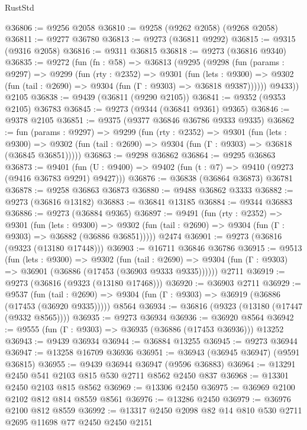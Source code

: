 \begin{lexlean}{RustStd}
\begin{coremodule}
{\begin{coremodule}
{{{{{{{{{{{{{{{{{{{{{{{{{{{{{{{{{{{{{{{{{{{{{{{{{{{{{{{@36806 := @9256 @2058
@36810 := @9258 (@9262 @2058) (@9268 @2058)
@36811 := @9277 @36780
@36813 := @9273 (@36811 @9292)
@36815 := @9315 (@9316 @2058)
@36816 := @9311 @36815
@36818 := @9273 (@36816 @9340)
@36835 := @9272
    (fun (fn : @58) =>
    @36813
      (@9295
        (@9298
          (fun (params : @9297) =>
          @9299
            (fun (rty : @2352) =>
            @9301
              (fun (lets : @9300) =>
              @9302 (fun (tail : @2690) => @9304 (fun (Γ : @9303) => @36818 @9387))))))
        @9433))
    @2105
@36838 := @9439 (@36811 (@9290 @2105))
@36841 := @9352 (@9353 @2105) @36783
@36845 := @9273 (@9344 (@36841 @9361) @9365)
@36846 := @9378 @2105
@36851 := @9375 (@9377 @36846 @36786 @9333 @9335)
@36862 := fun (params : @9297) =>
  @9299
    (fun (rty : @2352) =>
    @9301
      (fun (lets : @9300) =>
      @9302 (fun (tail : @2690) => @9304 (fun (Γ : @9303) => @36818 (@36845 @36851)))))
@36863 := @9298 @36862
@36864 := @9295 @36863
@36873 := @9401
    (fun (U : @9400) => @9402 (fun (t : @7) => @9410 (@9273 (@9416 @36783 @9291) @9427)))
@36876 := @36838 (@36864 @36873) @36781
@36878 := @9258 @36863 @36873
@36880 := @9488 @36862 @3333
@36882 := @9273 (@36816 @13182)
@36883 := @36841 @13185
@36884 := @9344 @36883
@36886 := @9273 (@36884 @9365)
@36897 := @9491
    (fun (rty : @2352) =>
    @9301
      (fun (lets : @9300) =>
      @9302 (fun (tail : @2690) => @9304 (fun (Γ : @9303) => @36882 (@36886 @36851)))))
    @2474
@36901 := @9273 (@36816 (@9323 (@13180 @17448)))
@36903 := @16711 @36846 @36786
@36915 := @9513
    (fun (lets : @9300) =>
    @9302
      (fun (tail : @2690) =>
      @9304 (fun (Γ : @9303) => @36901 (@36886 (@17453 (@36903 @9333 @9335))))))
    @2711
@36919 := @9273 (@36816 (@9323 (@13180 @17468)))
@36920 := @36903 @2711
@36929 := @9537
    (fun (tail : @2690) => @9304 (fun (Γ : @9303) => @36919 (@36886 (@17453 (@36920 @9335)))))
    @8564
@36934 := @36816 (@9323 (@13180 (@17447 (@9332 @8565))))
@36935 := @9273 @36934
@36936 := @36920 @8564
@36942 := @9555 (fun (Γ : @9303) => @36935 (@36886 (@17453 @36936))) @13252
@36943 := @9439 @36934
@36944 := @36884 @13255
@36945 := @9273 @36944
@36947 := @13258 @16709 @36936
@36951 := @36943 (@36945 @36947) (@9591 @36815)
@36955 := @9439 @36944 @36947 (@9596 @36883)
@36964 := @13291 @2450 @541 @2103 @815 @530 @2711 @8562 @2450 @837
@36968 := @13301 @2450 @2103 @815 @8562
@36969 := @13306 @2450
@36975 := @36969 @2100 @2102 @812 @814 @8559 @8561
@36976 := @13286 @2450
@36979 := @36976 @2100 @812 @8559
@36992 := @13317 @2450 @2098 @82 @14 @810 @530 @2711 @2695 @11698 @77 @2450 @2450 @2151
}}}}}}}}}}}}}}}}}}}}}}}}}}}}}}}}}}}}}}}}}}}}}}}}}}}}}}}
\end{coremodule}}
\end{coremodule}
\end{lexlean}
